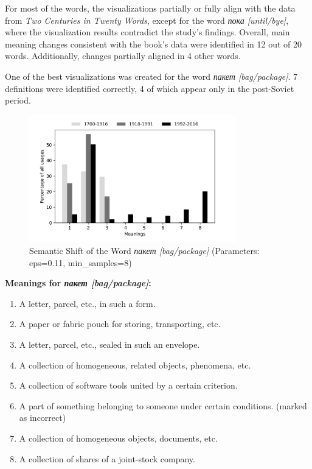 \documentclass[11pt]{article}
\begin{document}
For most of the words, the visualizations partially or fully align with the data from \textit{Two Centuries in Twenty Words},
except for the word \textit{пока [until/bye]}, where the visualization results contradict the study’s findings.
Overall, main meaning changes consistent with the book's data were identified in 12 out of 20 words.
Additionally, changes partially aligned in 4 other words.

One of the best visualizations was created for the word \textit{пакет [bag/package]}.
7 definitions were identified correctly, 4 of which appear only in the post-Soviet period.

\begin{figure}[H]
    \centering
    \includegraphics[width=0.8\textwidth]{img/paket_minimal}
    \caption{Semantic Shift of the Word \textit{пакет [bag/package]} (Parameters: eps=0.11, min\_samples=8)}
    \label{fig:paket_example}
\end{figure}

\begin{center}
    \begin{minipage}{0.7\textwidth}
        \centering
        \textbf{Meanings for \textit{пакет [bag/package]}:}
        \begin{enumerate}
            \item A letter, parcel, etc., in such a form.
            \item A paper or fabric pouch for storing, transporting, etc.
            \item A letter, parcel, etc., sealed in such an envelope.
            \item A collection of homogeneous, related objects, phenomena, etc.
            \item A collection of software tools united by a certain criterion.
            \item A part of something belonging to someone under certain conditions. (marked as incorrect)
            \item A collection of homogeneous objects, documents, etc.
            \item A collection of shares of a joint-stock company.
        \end{enumerate}
    \end{minipage}
\end{center}
\end{document}
